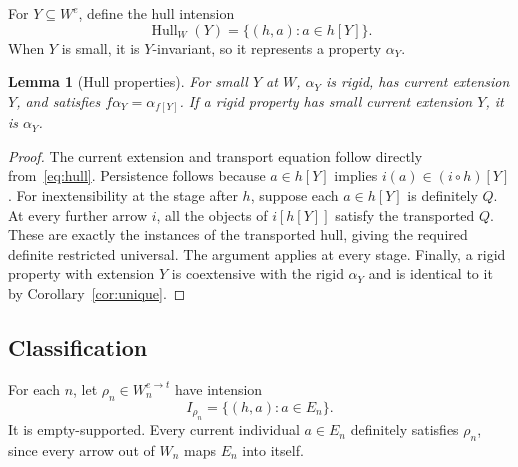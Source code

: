 \documentclass[11pt]{article}
\newtheorem{lemma}[theorem]{Lemma}
\theoremstyle{definition}
\newcommand{\Hull}{\operatorname{Hull}}
\numberwithin{equation}{section}
\begin{document}
For $Y\subseteq W^e$, define the hull intension
\begin{equation}\label{eq:hull}
\Hull_W(Y)=\{(h,a):a\in h[Y]\}.
\end{equation}
When $Y$ is small, it is $Y$-invariant, so it represents a property $\alpha_Y$.

\begin{lemma}[Hull properties]\label{lem:hulls}
For small $Y$ at $W$, $\alpha_Y$ is rigid, has current extension $Y$, and satisfies $f\alpha_Y=\alpha_{f[Y]}$. If a rigid property has small current extension $Y$, it is $\alpha_Y$.
\end{lemma}
\begin{proof}
The current extension and transport equation follow directly from~\eqref{eq:hull}. Persistence follows because $a\in h[Y]$ implies $i(a)\in(i\circ h)[Y]$. For inextensibility at the stage after $h$, suppose each $a\in h[Y]$ is definitely $Q$. At every further arrow $i$, all the objects of $i[h[Y]]$ satisfy the transported $Q$. These are exactly the instances of the transported hull, giving the required definite restricted universal. The argument applies at every stage. Finally, a rigid property with extension $Y$ is coextensive with the rigid $\alpha_Y$ and is identical to it by Corollary~\ref{cor:unique}.
\end{proof}

\subsection{Classification}

For each $n$, let $\rho_n\in W_n^{e\to t}$ have intension
$$
I_{\rho_n}=\{(h,a):a\in E_n\}.
$$
It is empty-supported. Every current individual $a\in E_n$ definitely satisfies $\rho_n$, since every arrow out of $W_n$ maps $E_n$ into itself.
\end{document}
